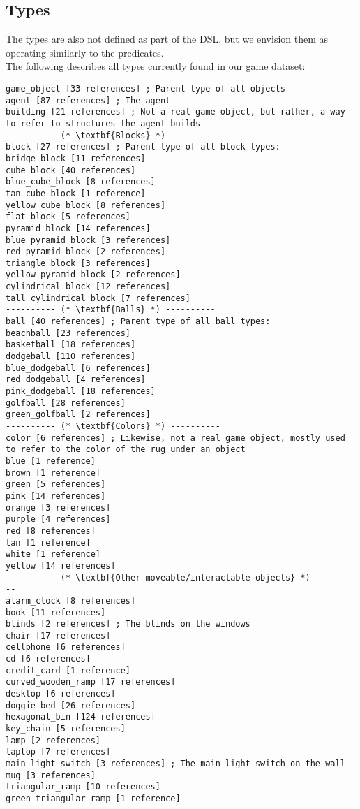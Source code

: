 \documentclass{article}
\begin{document}
\subsection{Types}
The types are also not defined as part of the DSL, but we envision them as operating similarly to the predicates. \\
            
            The following describes all types currently found in our game dataset: 
        
\begin{lstlisting}
game_object [33 references] ; Parent type of all objects
agent [87 references] ; The agent
building [21 references] ; Not a real game object, but rather, a way to refer to structures the agent builds
---------- (* \textbf{Blocks} *) ----------
block [27 references] ; Parent type of all block types:
bridge_block [11 references] 
cube_block [40 references] 
blue_cube_block [8 references] 
tan_cube_block [1 reference] 
yellow_cube_block [8 references] 
flat_block [5 references] 
pyramid_block [14 references] 
blue_pyramid_block [3 references] 
red_pyramid_block [2 references] 
triangle_block [3 references] 
yellow_pyramid_block [2 references] 
cylindrical_block [12 references] 
tall_cylindrical_block [7 references] 
---------- (* \textbf{Balls} *) ----------
ball [40 references] ; Parent type of all ball types:
beachball [23 references] 
basketball [18 references] 
dodgeball [110 references] 
blue_dodgeball [6 references] 
red_dodgeball [4 references] 
pink_dodgeball [18 references] 
golfball [28 references] 
green_golfball [2 references] 
---------- (* \textbf{Colors} *) ----------
color [6 references] ; Likewise, not a real game object, mostly used to refer to the color of the rug under an object
blue [1 reference] 
brown [1 reference] 
green [5 references] 
pink [14 references] 
orange [3 references] 
purple [4 references] 
red [8 references] 
tan [1 reference] 
white [1 reference] 
yellow [14 references] 
---------- (* \textbf{Other moveable/interactable objects} *) ----------
alarm_clock [8 references] 
book [11 references] 
blinds [2 references] ; The blinds on the windows
chair [17 references] 
cellphone [6 references] 
cd [6 references] 
credit_card [1 reference] 
curved_wooden_ramp [17 references] 
desktop [6 references] 
doggie_bed [26 references] 
hexagonal_bin [124 references] 
key_chain [5 references] 
lamp [2 references] 
laptop [7 references] 
main_light_switch [3 references] ; The main light switch on the wall
mug [3 references] 
triangular_ramp [10 references] 
green_triangular_ramp [1 reference] 

\end{lstlisting}
\end{document}
